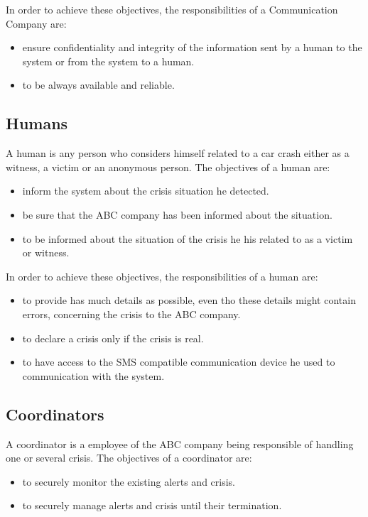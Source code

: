 In order to achieve these objectives, the responsibilities of a Communication Company are:
\begin{itemize}
  \item ensure confidentiality and integrity of the information sent by a human to the \msricrash system or from the system to a human.
  \item to be always available and reliable.
\end{itemize}

\subsection{Humans}
A human is any person who considers himself related to a car crash either as a witness, a victim or an anonymous person. The objectives of a human are:
\begin{itemize}
  \item inform the \msricrash system about the crisis situation he detected.
  \item be sure that the ABC company has been informed about the situation.
  \item to be informed about the situation of the crisis he his related to as a victim or witness.
\end{itemize}
\vspace{0.5cm}

In order to achieve these objectives, the responsibilities of a human are:
\begin{itemize}
  \item to provide has much details as possible, even tho these details might
  contain errors, concerning the crisis to the ABC company.
  \item to declare a crisis only if the crisis is real.
  \item to have access to the SMS compatible communication device he used to communication with the \msricrash system.
\end{itemize}

\subsection{Coordinators}
A coordinator is a employee of the ABC company being responsible of handling one or several crisis. The objectives of a coordinator are:
\begin{itemize}
  \item to securely monitor the existing alerts and crisis.
  \item to securely manage alerts and crisis until their termination.
\end{itemize}
\vspace{0.5cm}

